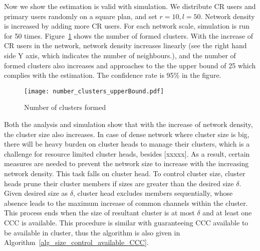 Now we show the estimation is valid with simulation.
We distribute CR users and primary users randomly on a square plan, and set $r=10, l=50$.
Network density is increased by adding more CR users.
For each network scale, simulation is run for 50 times.
Figure~\ref{number_clusters_scale} shows the number of formed clusters.
With the increase of CR users in the network, network density increases linearly (see the right hand side Y axis, which indicates the number of neighbours.), and the number of formed clusters also increases and approaches to the the upper bound of 25 which complies with the estimation.
The confidence rate is 95\% in the figure.

\begin{figure}[ht!]
  \centering
  \texttt{[image: number\_clusters\_upperBound.pdf]}
  \caption{Number of clusters formed}
  \label{number_clusters_scale}
\end{figure}

Both the analysis and simulation show that with the increase of network density, the cluster size also increases.
In case of dense network where cluster size is big, there will be heavy burden on cluster heads to manage their clusters, which is a challenge for resource limited cluster heads, besides [xxxxx].
As a result, certain measures are needed to prevent the network size to increase with the increasing network density.
This task falls on cluster head.
To control cluster size, cluster heads prune their cluster members if sizes are greater than the desired size $\delta$.
Given desired size as $\delta$, cluster head excludes members sequentially, whose absence leads to the maximum increase of common channels within the cluster.
This process ends when the size of resultant cluster is at most $\delta$ and at least one CCC is available.
This procedure is similar with guaranteeing CCC available to be available in cluster, thus the algorithm is also given in Algorithm~\ref{alg_size_control_available_CCC}.


